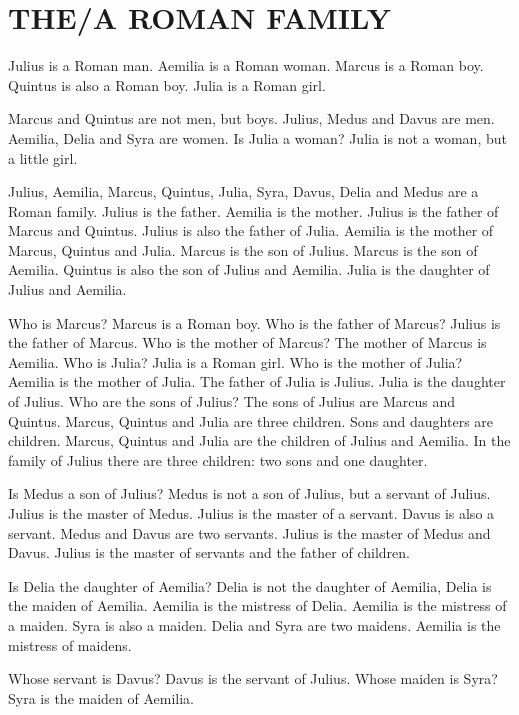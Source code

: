 
\chapter{THE/A ROMAN FAMILY}

\linenumbers[1]

Julius is a Roman man. Aemilia is a Roman woman. Marcus is a Roman boy. Quintus is also a Roman boy. Julia is a Roman girl.

Marcus and Quintus are not men, but boys. Julius, Medus and Davus are men. Aemilia, Delia and Syra are women. Is Julia a woman? Julia is not a woman, but a little girl.

Julius, Aemilia, Marcus, Quintus, Julia, Syra, Davus, Delia and Medus are a Roman family. Julius is the father. Aemilia is the mother. Julius is the father of Marcus and Quintus. Julius is also the father of Julia. Aemilia is the mother of Marcus, Quintus and Julia. Marcus is the son of Julius. Marcus is the son of Aemilia. Quintus is also the son of Julius and Aemilia. Julia is the daughter of Julius and Aemilia.

Who is Marcus? Marcus is a Roman boy. Who is the father of Marcus? Julius is the father of Marcus. Who is the mother of Marcus? The mother of Marcus is Aemilia. Who is Julia? Julia is a Roman girl. Who is the mother of Julia? Aemilia is the mother of Julia. The father of Julia is Julius. Julia is the daughter of Julius. Who are the sons of Julius? The sons of Julius are Marcus and Quintus. Marcus, Quintus and Julia are three children. Sons and daughters are children. Marcus, Quintus and Julia are the children of Julius and Aemilia. In the family of Julius there are three children: two sons and one daughter.

Is Medus a son of Julius? Medus is not a son of Julius, but a servant of Julius. Julius is the master of Medus. Julius is the master of a servant. Davus is also a servant. Medus and Davus are two servants. Julius is the master of Medus and Davus. Julius is the master of servants and the father of children.

Is Delia the daughter of Aemilia? Delia is not the daughter of Aemilia, Delia is the maiden of Aemilia. Aemilia is the mistress of Delia. Aemilia is the mistress of a maiden. Syra is also a maiden. Delia and Syra are two maidens. Aemilia is the mistress of maidens.

Whose servant is Davus? Davus is the servant of Julius. Whose maiden is Syra? Syra is the maiden of Aemilia.

